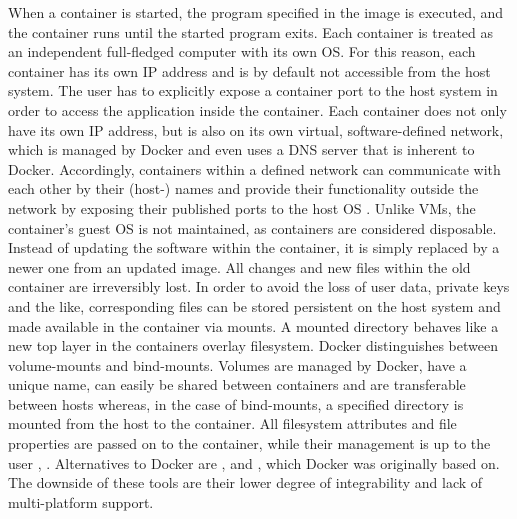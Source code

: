         
        When a container is started, the program specified in the image is executed, and the container runs until the started program exits. Each container is treated as an independent full-fledged computer with its own \ac{OS}. For this reason, each container has its own IP address and is by default not accessible from the host system. The user has to explicitly expose a container port to the host system in order to access the application inside the container. Each container does not only have its own IP address, but is also on its own virtual, software-defined network, which is managed by Docker and even uses a \ac{DNS} server that is inherent to Docker. Accordingly, containers within a defined network can communicate with each other by their (host-) names and provide their functionality outside the network by exposing their published ports to the host \ac{OS} \cite{docker2020}.\newline
        Unlike \ac{VM}s, the container's guest \ac{OS} is not maintained, as containers are considered disposable. Instead of updating the software within the container, it is simply replaced by a newer one from an updated image. All changes and new files within the old container are irreversibly lost. In order to avoid the loss of user data, private keys and the like, corresponding files can be stored persistent on the host system and made available in the container via mounts. A mounted directory behaves like a new top layer in the containers overlay filesystem. Docker distinguishes between volume-mounts and bind-mounts. Volumes are managed by Docker, have a unique name, can easily be shared between containers and are transferable between hosts whereas, in the case of bind-mounts, a specified directory is mounted from the host to the container. All filesystem attributes and file properties are passed on to the container, while their management is up to the user \cite{docker2020}, \cite{dockerdocs}.\newline
        Alternatives to Docker are ,  and , which Docker was originally based on. The downside of these tools are their lower degree of integrability and lack of multi-platform support.

